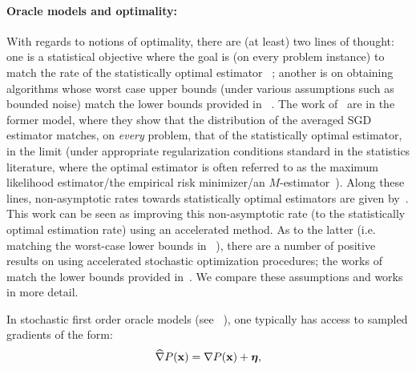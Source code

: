 \paragraph{Oracle models and optimality:}With regards to notions of optimality, there are (at least) two lines
of thought: one is a statistical objective where the goal is (on every
problem instance) to match the rate of the statistically optimal
estimator~
\citep{anbar1971optimal,Fabian:1973:AES,KushnerClark,PolyakJ92};
another is on obtaining algorithms whose worst case upper bounds
(under various assumptions such as bounded noise) match the lower
bounds provided in ~\cite{NemirovskyY83}.  The work of~\cite{PolyakJ92} are in the former model, where
they show that the distribution of the averaged SGD
estimator matches, on \emph{every} problem, that of the statistically
optimal estimator, in the limit (under appropriate regularization
conditions standard in the statistics literature, where the optimal
estimator is often referred to as the maximum likelihood estimator/the
empirical risk minimizer/an
$M$-estimator~\citep{lehmann1998theory,Vaart00}). Along these lines,
non-asymptotic rates towards statistically optimal estimators are
given
by~\cite{BachM13,Bach14,DefossezB15,DieuleveutB15,NeedellSW16,FrostigGKS15,JainKKNS16}. This work can be seen as improving this non-asymptotic rate (to the
statistically optimal estimation rate) using an accelerated method. As to the latter (i.e. matching the worst-case lower bounds in
~\cite{NemirovskyY83}), there are a number of 
positive results on using accelerated stochastic
optimization procedures; the works
of~\cite{Lan08,HuKP09,ghadimi2012optimal,ghadimi2013optimal,DieuleveutFB16}
match the lower bounds provided in~\cite{NemirovskyY83}. We
compare these assumptions and works in more detail.

In stochastic first order oracle models (see ~\cite{KushnerClark,KushnerY03}), one typically has access to sampled gradients of the form:%
\vspace{-0.2cm}
\begin{align}
\widehat{\nabla}P(\mathbf{x})  = \nabla P(\mathbf{x}) + \boldsymbol{\eta}, \label{eq:stochFirstOrderOracle-diff}
\end{align}

